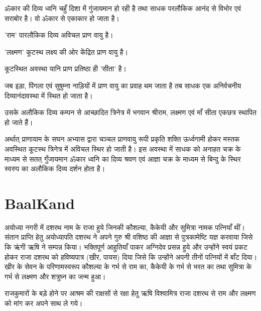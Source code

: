 \documentclass[makeidx, 10pt, oneside, onecolumn, openright, final, svgnames, dvipsnames, extrafontsizes]{memoir}
\begin{document}
ॐकार की दिव्य ध्वनि चहुँ दिशा में गुंजायमान हो रही है तथा साधक परलौकिक आनंद से विभोर एवं सराबोर है। वो ॐकार से एकाकार हो जाता है।

'राम' पारलौकिक दिव्य अविचल प्राण वायु है। 

'लक्ष्मण' कूटस्थ लक्ष्य की ओर केंद्रित प्राण वायु है। 

कूटस्थित अवस्था यानि प्राण प्रतिष्ठा ही 'सीता' है।

जब इड़ा, पिंगला एवं सुषुम्ना नाड़ियों में प्राण वायु का प्रवाह थम जाता है तब साधक एक अनिर्वचनीय दिव्यानंदावस्था में स्थित हो जाता है। 

उसके अलौकिक दिव्य कम्पन से आच्छादित त्रिनेत्र में भगवान श्रीराम, लक्ष्मण एवं माँ सीता एकछत्र स्थापित हो जाते हैं।

अर्थात् प्राणायाम के सघन अभ्यास द्वारा चञ्चल प्राणवायु रूपी प्रकृति शक्ति ऊर्ध्वगामी होकर मस्तक अवस्थित कूटस्थ त्रिनेत्र में अविचल स्थिर हो जाती है। इस अवस्था में साधक को अनाहत चक्र के माध्यम से सतत् गुँजायमान ॐकार ध्वनि का दिव्य श्रवण एवं आज्ञा चक्र के माध्यम से बिन्दु के स्थिर स्वरुप का अलौकिक दिव्य दर्शन होता है।    



\chapter[बालकाण्ड]{BaalKand}
\thispagestyle{empty}


\hspace{5mm}अयोध्या नगरी में दशरथ नाम के राजा हुये जिनकी कौशल्या, कैकेयी और सुमित्रा नामक पत्नियाँ थीं। संतान प्राप्ति हेतु अयोध्यापति दशरथ ने अपने गुरु श्री वशिष्ठ की आज्ञा से पुत्रकामेष्टि यज्ञ करवाया जिसे कि ऋंगी ऋषि ने सम्पन्न किया। भक्तिपूर्ण आहुतियाँ पाकर अग्निदेव प्रसन्न हुये और उन्होंने स्वयं प्रकट होकर राजा दशरथ को हविष्यपात्र (खीर, पायस) दिया जिसे कि उन्होंने अपनी तीनों पत्नियों में बाँट दिया। खीर के सेवन के परिणामस्वरूप कौशल्या के गर्भ से राम का, कैकेयी के गर्भ से भरत का तथा सुमित्रा के गर्भ से लक्ष्मण और शत्रुघ्न का जन्म हुआ।

राजकुमारों के बड़े होने पर आश्रम की राक्षसों से रक्षा हेतु ऋषि विश्वामित्र राजा दशरथ से राम और लक्ष्मण को मांग कर अपने साथ ले गये। 
\end{document}
